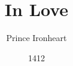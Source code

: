 \documentclass{scrbook}
\begin{document}
\extratitle{\textbf{\Huge In Love}}

\title{In Love}

\author{Prince Ironheart}
\date{1412}

\lowertitleback{This poem book was set with%
the help of {\KOMAScript} and {\LaTeX}}

\uppertitleback{Self-mockery Publishers}

\dedication{To my treasured hazel-hen\\
                    in eternal love\\
            from your dormouse.}

\maketitle
\end{document}
